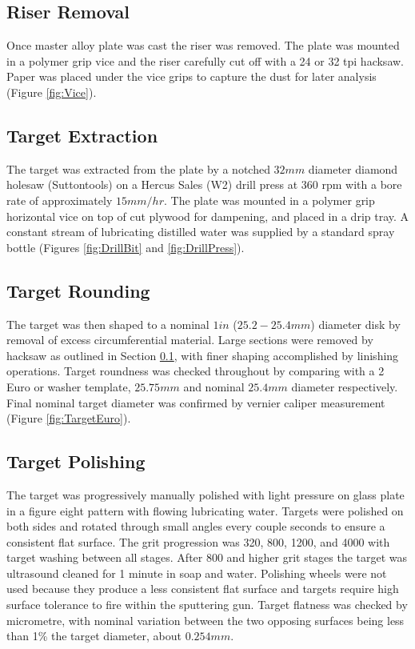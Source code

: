 \documentclass[a4paper,12pt,oneside]{report}%
\begin{document}
\subsection{Riser Removal} \label{sec:RiserRemoval}
Once master alloy plate was cast the riser was removed. The plate was mounted in a polymer grip vice and the riser carefully cut off with a 24 or 32 \acrshort{tpi} hacksaw. Paper was placed under the vice grips to capture the dust for later analysis (Figure \ref{fig:Vice}).

\subsection{Target Extraction}
The target was extracted from the plate by a notched $32 mm$ diameter diamond holesaw (Suttontools) on a Hercus Sales (W2) drill press at 360 \acrshort{rpm} with a bore rate of approximately $15 mm/hr$. The plate was mounted in a polymer grip horizontal vice on top of cut plywood for dampening, and placed in a drip tray. A constant stream of lubricating distilled water was supplied by a standard spray bottle (Figures \ref{fig:DrillBit} and \ref{fig:DrillPress}).

\subsection{Target Rounding}
The target was then shaped to a nominal $1 in$ ($25.2 - 25.4 mm$) diameter disk by removal of excess circumferential material. Large sections were removed by hacksaw as outlined in Section \ref{sec:RiserRemoval}, with finer shaping accomplished by linishing operations. Target roundness was checked throughout by comparing with a 2 Euro or washer template, $25.75 mm$ and nominal $25.4 mm$ diameter respectively. Final nominal target diameter was confirmed by vernier caliper measurement (Figure \ref{fig:TargetEuro}). 

\subsection{Target Polishing} \label{sec:SemiCryPolishing}
The target was progressively manually polished with light pressure on glass plate in a figure eight pattern with flowing lubricating water. Targets were polished on both sides and rotated through small angles every couple seconds to ensure a consistent flat surface. The grit progression was 320, 800, 1200, and 4000 with target washing between all stages. After 800 and higher grit stages the target was ultrasound cleaned for 1 minute in soap and water. Polishing wheels were not used because they produce a less consistent flat surface and targets require high surface tolerance to fire within the sputtering gun. Target flatness was checked by micrometre, with nominal variation between the two opposing surfaces being less than 1\% the target diameter, about $0.254 mm$. 
\end{document}
